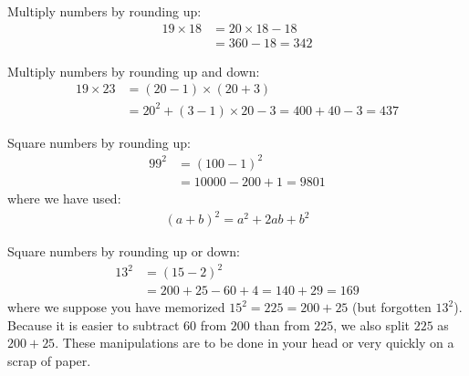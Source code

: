 Multiply numbers by rounding up:
\begin{align*}
19 \times 18
 & = 20 \times 18 - 18\\
 & = 360 - 18 = 342
\end{align*}

Multiply numbers by rounding up and down:
\begin{align*}
19 \times 23
 & = (20-1) \times (20+3) \\
 & = 20^2 + (3-1) \times 20 -3 = 400 + 40 - 3 = 437
\end{align*}

Square numbers by rounding up:
\begin{align*}
99^2 
 & = (100-1)^2 \\
 & = 10000 - 200 + 1 = 9801
\end{align*}
where we have used:
\begin{align*}
(a + b)^2 = a^2 + 2ab + b^2
\end{align*}

Square numbers by rounding up or down:
\begin{align*}
13^2 
 & = (15-2)^2 \\
 & = 200 + 25 - 60 + 4 = 140 + 29 = 169
\end{align*}
where we suppose you have memorized $15^2=225=200+25$ (but forgotten $13^2$). Because it is easier to subtract $60$ from $200$ than from $225$, we also split $225$ as $200+25$. These manipulations are to be done in your head or very quickly on a scrap of paper. 
